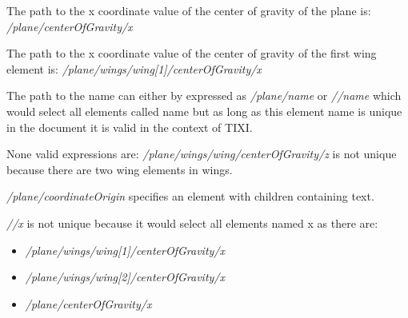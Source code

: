 The path to the x coordinate value of the center of gravity of the plane is: \textit{/plane/centerOfGravity/x}

The path to the x coordinate value of the center of gravity of the first wing element is: \textit{/plane/wings/wing[1]/centerOfGravity/x}

The path to the name can either by expressed as \textit{/plane/name} or \textit{//name} which would select all elements called name but as long as this element name is unique in the document it is valid in the context of TIXI.

None valid expressions are: \textit{/plane/wings/wing/centerOfGravity/z} is not unique because there are two wing elements in wings.

\textit{/plane/coordinateOrigin} specifies an element with children containing text.

\textit{//x} is not unique because it would select all elements named x as there are:
\begin{itemize}
	\item \textit{/plane/wings/wing[1]/centerOfGravity/x}
	\item \textit{/plane/wings/wing[2]/centerOfGravity/x}
	\item \textit{/plane/centerOfGravity/x}
\end{itemize}

